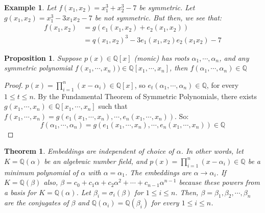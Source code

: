 \documentclass{article}
\newcommand{\Q}{\mathbb{Q}}
\newtheorem{theorem}{Theorem}[subsection]
\newtheorem{example}{Example}[subsection]
\newtheorem{proposition}{Proposition}[subsection]
\begin{document}
\begin{example}
Let $f(x_1,x_2)=x_1^3+x_2^3-7$ be symmetric. Let $g(x_1,x_2)=x_1^3-3x_1x_2-7$ be not symmetric. But then, we see that:
\begin{align*}
    f(x_1,x_2)&=g(e_1(x_1,x_2)+e_2(x_1,x_2))\\
    &=q(x_1,x_2)^3-3e_1(x_1,x_2)e_2(x_1x_2)-7
\end{align*}
\end{example}
\begin{proposition}
Suppose $p(x)\in\Q[x]$ (monic) has roots $\alpha_1,\cdots,\alpha_n$, and any symmetric polynomial $f(x_1,\cdots, x_n))\in\Q[x_1,\cdots,x_n]$, then $f(\alpha_1,\cdots,\alpha_n)\in\Q$
\end{proposition}
\begin{proof}
$p(x)=\displaystyle\prod_{i=1}^n(x-\alpha_i)\in\Q[x]$, so $e_t(\alpha_1,\cdots, \alpha_n)\in\Q$, for every $1\leq t\leq n$. By the Fundamental Theorem of Symmetric Polynomials, there exists $g(x_1,\cdots, x_n)\in\Q[x_1,\cdots, x_n]$ such that $f(x_1,\cdots, x_n)=g(e_1(x_1,\cdots, x_n),\cdots, e_n(x_1,\cdots, x_n))$. So:
$$f(\alpha_1,\cdots, \alpha_n)=g(e_1(x_1,\cdots, x_n),\cdots, e_n(x_1,\cdots, x_n))\in\Q$$
\end{proof}
\newpage
\begin{theorem}
Embeddings are independent of choice of $\alpha$. In other words, let $K=\Q(\alpha)$ be an algebraic number field, and $p(x)=\displaystyle\prod_{i=1}^n(x-\alpha_i)\in\Q$ be a minimum polynomial of $\alpha$ with $\alpha=\alpha_1$. The embeddings are $\alpha\rightarrow \alpha_i$. If $K=\Q(\beta)$ also, $\beta=c_0+c_1\alpha+c_2\alpha^2+\cdots +c_{n-1}\alpha^{n-1}$ because these powers from a basis for $K=\Q(\alpha)$. Let $\beta_i=\sigma_i(\beta)$ for $1\leq i\leq n$. Then, $\beta=\beta_1,\beta_2,\cdots, \beta_n$ are the conjugates of $\beta$ and $\Q(\alpha_i)=\Q(\beta_i)$ for every $1\leq i\leq n$.
\end{theorem}
\end{document}

